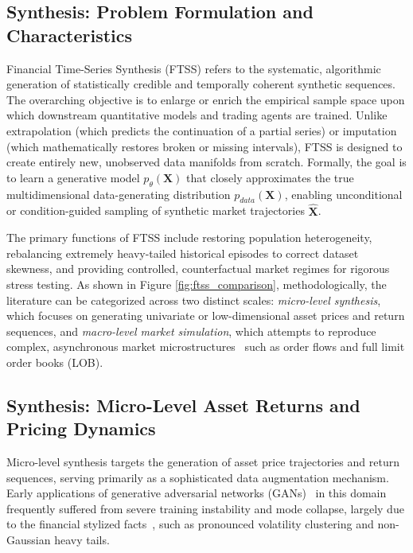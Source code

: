 \subsection{Synthesis: Problem Formulation and Characteristics}
\label{sec:synthesis}

Financial Time-Series Synthesis (FTSS) refers to the systematic, algorithmic generation of statistically credible and temporally coherent synthetic sequences. The overarching objective is to enlarge or enrich the empirical sample space upon which downstream quantitative models and trading agents are trained. Unlike extrapolation (which predicts the continuation of a partial series) or imputation (which mathematically restores broken or missing intervals), FTSS is designed to create entirely new, unobserved data manifolds from scratch. Formally, the goal is to learn a generative model $p_\theta(\mathbf{X})$ that closely approximates the true multidimensional data-generating distribution $p_{data}(\mathbf{X})$, enabling unconditional or condition-guided sampling of synthetic market trajectories $\hat{\mathbf{X}}$.

The primary functions of FTSS include restoring population heterogeneity, rebalancing extremely heavy-tailed historical episodes to correct dataset skewness, and providing controlled, counterfactual market regimes for rigorous stress testing. As shown in Figure \ref{fig:ftss_comparison}, methodologically, the literature can be categorized across two distinct scales: \textit{micro-level synthesis}, which focuses on generating univariate or low-dimensional asset prices and return sequences, and \textit{macro-level market simulation}, which attempts to reproduce complex, asynchronous market microstructures~\citep{ohara1995market,gould2013limit} such as order flows and full limit order books (LOB).

\subsection{Synthesis: Micro-Level Asset Returns and Pricing Dynamics}

Micro-level synthesis targets the generation of asset price trajectories and return sequences, serving primarily as a sophisticated data augmentation mechanism. Early applications of generative adversarial networks (GANs)~\citep{goodfellow2014gan} in this domain frequently suffered from severe training instability and mode collapse, largely due to the financial stylized facts~\citep{cont2001empirical,mandelbrot1963variation}, such as pronounced volatility clustering and non-Gaussian heavy tails.

